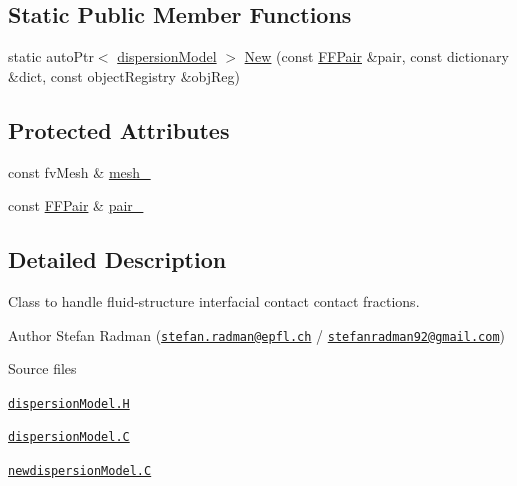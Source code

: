 \subsection*{Static Public Member Functions}
\begin{DoxyCompactItemize}
\item 
static auto\+Ptr$<$ \hyperlink{classFoam_1_1dispersionModel}{dispersion\+Model} $>$ \hyperlink{classFoam_1_1dispersionModel_aeee036606f42c1dd098c92c9e5b58d3a}{New} (const \hyperlink{classFoam_1_1FFPair}{F\+F\+Pair} \&pair, const dictionary \&dict, const object\+Registry \&obj\+Reg)
\end{DoxyCompactItemize}
\subsection*{Protected Attributes}
\begin{DoxyCompactItemize}
\item 
const fv\+Mesh \& \hyperlink{classFoam_1_1dispersionModel_a23edeeeecebcef11921a33dd5d990570}{mesh\+\_\+}
\item 
const \hyperlink{classFoam_1_1FFPair}{F\+F\+Pair} \& \hyperlink{classFoam_1_1dispersionModel_ad015e769561f394d7c717d4356dcded4}{pair\+\_\+}
\end{DoxyCompactItemize}


\subsection{Detailed Description}
Class to handle fluid-\/structure interfacial contact contact fractions. 

\label{_Description}%
 Author Stefan Radman (\href{mailto:stefan.radman@epfl.ch}{\tt stefan.\+radman@epfl.\+ch} / \href{mailto:stefanradman92@gmail.com}{\tt stefanradman92@gmail.\+com})

\begin{DoxyParagraph}{Source files}

\begin{DoxyItemize}
\item \href{../../../home/carlo/data/GeN-Foam/GeN-Foam_ffn/GeN-Foam/GeN-Foam/classes/thermalHydraulics/src/physicsModels/dispersionModels/dispersionModel.H}{\tt dispersion\+Model.\+H} 
\item \href{../../../home/carlo/data/GeN-Foam/GeN-Foam_ffn/GeN-Foam/GeN-Foam/classes/thermalHydraulics/src/physicsModels/dispersionModels/dispersionModel.C}{\tt dispersion\+Model.\+C} 
\item \href{../../../home/carlo/data/GeN-Foam/GeN-Foam_ffn/GeN-Foam/GeN-Foam/classes/thermalHydraulics/src/physicsModels/dispersionModels/newdispersionModel.C}{\tt newdispersion\+Model.\+C} 
\end{DoxyItemize}
\end{DoxyParagraph}


